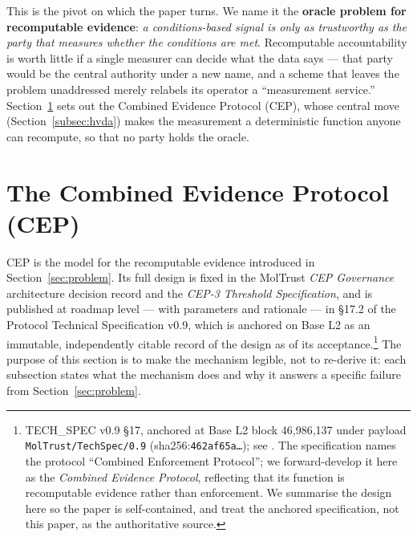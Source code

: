 This is the pivot on which the paper turns. We name it the \textbf{oracle problem for recomputable evidence}: \emph{a conditions-based signal is only as trustworthy as the party that measures whether the conditions are met}. Recomputable accountability is worth little if a single measurer can decide what the data says — that party would be the central authority under a new name, and a scheme that leaves the problem unaddressed merely relabels its operator a ``measurement service.'' Section~\ref{sec:cep} sets out the Combined Evidence Protocol (CEP), whose central move (Section~\ref{subsec:hvda}) makes the measurement a deterministic function anyone can recompute, so that no party holds the oracle.

\section{The Combined Evidence Protocol (CEP)}
\label{sec:cep}

CEP is the model for the recomputable evidence introduced in Section~\ref{sec:problem}. Its full design is fixed in the MolTrust \emph{CEP Governance} architecture decision record and the \emph{CEP-3 Threshold Specification}, and is published at roadmap level — with parameters and rationale — in \S17.2 of the Protocol Technical Specification v0.9, which is anchored on Base L2 as an immutable, independently citable record of the design as of its acceptance.\footnote{TECH\_SPEC v0.9 \S17, anchored at Base L2 block 46{,}986{,}137 under payload \texttt{MolTrust/TechSpec/0.9} (sha256:\texttt{462af65a\ldots}); see \cite{ref28_techspec}. The specification names the protocol ``Combined Enforcement Protocol''; we forward-develop it here as the \emph{Combined Evidence Protocol}, reflecting that its function is recomputable evidence rather than enforcement. We summarise the design here so the paper is self-contained, and treat the anchored specification, not this paper, as the authoritative source.} The purpose of this section is to make the mechanism legible, not to re-derive it: each subsection states what the mechanism does and why it answers a specific failure from Section~\ref{sec:problem}.

